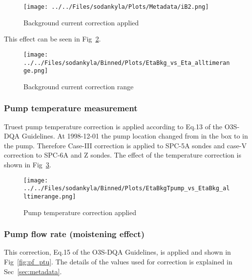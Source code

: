                 \begin{figure}
        \centering
        \texttt{[image: ../../Files/sodankyla/Plots/Metadata/iB2.png]}

    \caption{Background current correction applied}
            \label{fig:bkg_hom}
    \end{figure}
This effect can be seen in  Fig~\ref{fig:bkg}.

                \begin{figure}
        \centering
\texttt{[image: ../../Files/sodankyla/Binned/Plots/EtaBkg\_vs\_Eta\_alltimerange.png]}
    \caption{Background current correction range}
            \label{fig:bkg}
    \end{figure}

            \subsubsection{Pump temperature measurement}
 Truest pump temperature correction is applied according to Eq.13 of the O3S-DQA Guidelines. At 1998-12-01 the pump location changed from in the box to in the pump.
    Therefore Case-III correction is applied to SPC-5A sondes and case-V correction to SPC-6A and Z sondes. The effect of the temperature correction
is shown in  Fig~\ref{fig:tpump}.


                    \begin{figure}
        \centering
\texttt{[image: ../../Files/sodankyla/Binned/Plots/EtaBkgTpump\_vs\_EtaBkg\_alltimerange.png]}
    \caption{Pump temperature correction applied}
            \label{fig:tpump}
    \end{figure}

                \subsubsection{Pump flow rate (moistening effect)}
    This correction, Eq.15 of the O3S-DQA Guidelines, is applied and shown in Fig~\ref{fig:pf_ptu}. The details of the values used for
    correction is explained in Sec~\ref{sec:metadata}.

